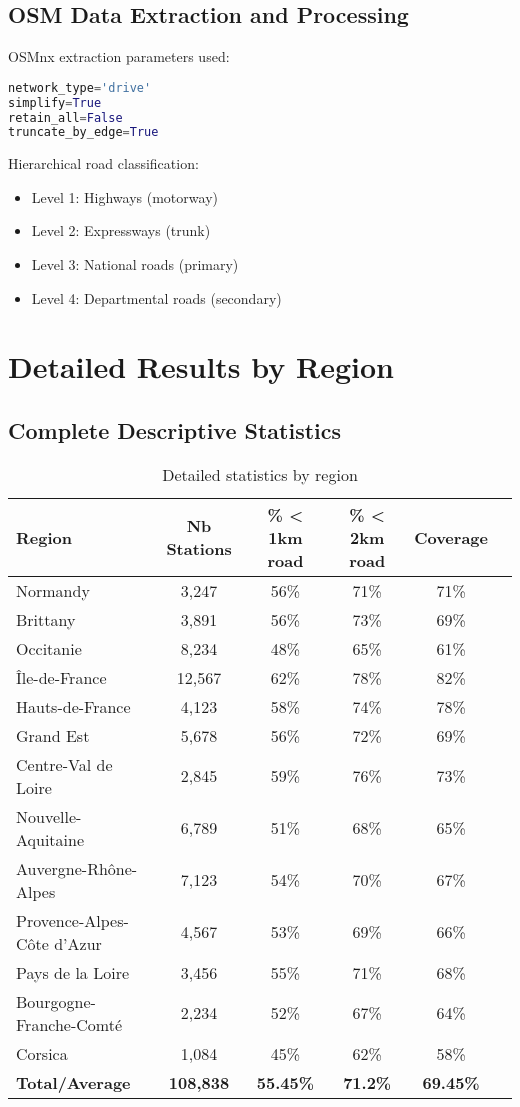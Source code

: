 \documentclass[12pt,a4paper]{report}
\begin{document}
\section{OSM Data Extraction and Processing}

OSMnx extraction parameters used:
\begin{lstlisting}[language=Python]
network_type='drive'
simplify=True
retain_all=False
truncate_by_edge=True
\end{lstlisting}

Hierarchical road classification:
\begin{itemize}
    \item Level 1: Highways (motorway)
    \item Level 2: Expressways (trunk)
    \item Level 3: National roads (primary)
    \item Level 4: Departmental roads (secondary)
\end{itemize}

\chapter{Detailed Results by Region}

\section{Complete Descriptive Statistics}

\begin{table}[H]
\centering
\caption{Detailed statistics by region}
\begin{tabular}{|l|c|c|c|c|c|}
\hline
\textbf{Region} & \textbf{Nb Stations} & \textbf{\% < 1km road} & \textbf{\% < 2km road} & \textbf{Coverage}  \\
\hline
Normandy & 3,247 & 56\% & 71\% & 71\%  \\
Brittany & 3,891 & 56\% & 73\% & 69\%  \\
Occitanie & 8,234 & 48\% & 65\% & 61\%\\
Île-de-France & 12,567 & 62\% & 78\% & 82\% \\
Hauts-de-France & 4,123 & 58\% & 74\% & 78\%  \\
Grand Est & 5,678 & 56\% & 72\% & 69\% \\
Centre-Val de Loire & 2,845 & 59\% & 76\% & 73\%  \\
Nouvelle-Aquitaine & 6,789 & 51\% & 68\% & 65\%  \\
Auvergne-Rhône-Alpes & 7,123 & 54\% & 70\% & 67\%  \\
Provence-Alpes-Côte d'Azur & 4,567 & 53\% & 69\% & 66\%  \\
Pays de la Loire & 3,456 & 55\% & 71\% & 68\%  \\
Bourgogne-Franche-Comté & 2,234 & 52\% & 67\% & 64\% \\
Corsica & 1,084 & 45\% & 62\% & 58\%\\
\hline
\textbf{Total/Average} & \textbf{108,838} & \textbf{55.45\%} & \textbf{71.2\%} & \textbf{69.45\%}  \\
\hline
\end{tabular}
\label{tab:statistiques-regions}
\end{table}
\end{document}
